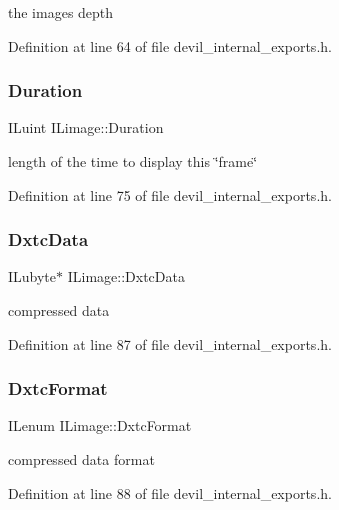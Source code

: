 the image\textquotesingle{}s depth 



Definition at line 64 of file devil\+\_\+internal\+\_\+exports.\+h.

\mbox{\label{structILimage_afde5827e053680ff1e81a9a9c0832042}} 
\subsubsection{\texorpdfstring{Duration}{Duration}}
{\footnotesize\ttfamily I\+Luint I\+Limage\+::\+Duration}



length of the time to display this \char`\"{}frame\char`\"{} 



Definition at line 75 of file devil\+\_\+internal\+\_\+exports.\+h.

\mbox{\label{structILimage_a65df57fee0fb33328ef00fecb7709638}} 
\subsubsection{\texorpdfstring{Dxtc\+Data}{DxtcData}}
{\footnotesize\ttfamily I\+Lubyte$\ast$ I\+Limage\+::\+Dxtc\+Data}



compressed data 



Definition at line 87 of file devil\+\_\+internal\+\_\+exports.\+h.

\mbox{\label{structILimage_a41c04c16ff79d67c0c20d726ea411805}} 
\subsubsection{\texorpdfstring{Dxtc\+Format}{DxtcFormat}}
{\footnotesize\ttfamily I\+Lenum I\+Limage\+::\+Dxtc\+Format}



compressed data format 



Definition at line 88 of file devil\+\_\+internal\+\_\+exports.\+h.


